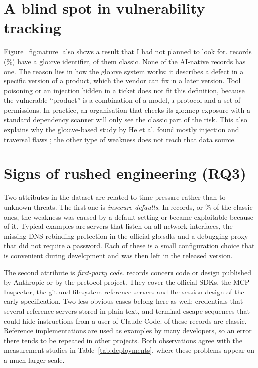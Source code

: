\section{A blind spot in vulnerability tracking}

\par Figure~\ref{fig:nature} also shows a result that I had not planned to look for. \nCve{} records (\pCve\%) have a \acrshort{glo:cve} identifier, \nCveClassic{} of them classic. None of the AI-native records has one. The reason lies in how the \acrshort{glo:cve} system works: it describes a defect in a specific version of a product, which the vendor can fix in a later version. Tool poisoning or an injection hidden in a ticket does not fit this definition, because the vulnerable ``product'' is a combination of a model, a protocol and a set of permissions. In practice, an organisation that checks its \acrshort{glo:mcp} exposure with a standard dependency scanner will only see the classic part of the risk. This also explains why the \acrshort{glo:cve}-based study by He et al. found mostly injection and traversal flaws \cite{he2026}; the other type of weakness does not reach that data source.

\section{Signs of rushed engineering (RQ3)}

\par Two attributes in the dataset are related to time pressure rather than to unknown threats. The first one is \textit{insecure defaults}. In \nInsecureDefault{} records, or \pInsecureDefaultOfClassic\% of the classic ones, the weakness was caused by a default setting or became exploitable because of it. Typical examples are servers that listen on all network interfaces, the missing DNS rebinding protection in the official \acrfull{glo:sdk}s and a debugging proxy that did not require a password. Each of these is a small configuration choice that is convenient during development and was then left in the released version.

\par The second attribute is \textit{first-party code}. \nFirstParty{} records concern code or design published by Anthropic or by the protocol project. They cover the official SDKs, the MCP Inspector, the git and filesystem reference servers and the session design of the early specification. Two less obvious cases belong here as well: credentials that several reference servers stored in plain text, and terminal escape sequences that could hide instructions from a user of Claude Code. \nFirstPartyClassic{} of these records are classic. Reference implementations are used as examples by many developers, so an error there tends to be repeated in other projects. Both observations agree with the measurement studies in Table~\ref{tab:deployments}, where these problems appear on a much larger scale.
